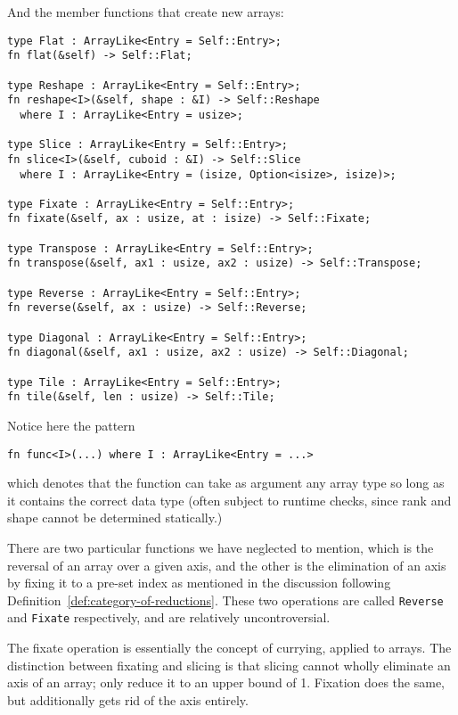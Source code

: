 \documentclass{DIKU-report-variant}
\begin{document}
And the member functions that create new arrays:

\begin{lstlisting}
type Flat : ArrayLike<Entry = Self::Entry>;
fn flat(&self) -> Self::Flat;

type Reshape : ArrayLike<Entry = Self::Entry>;
fn reshape<I>(&self, shape : &I) -> Self::Reshape
  where I : ArrayLike<Entry = usize>;

type Slice : ArrayLike<Entry = Self::Entry>;
fn slice<I>(&self, cuboid : &I) -> Self::Slice
  where I : ArrayLike<Entry = (isize, Option<isize>, isize)>;

type Fixate : ArrayLike<Entry = Self::Entry>;
fn fixate(&self, ax : usize, at : isize) -> Self::Fixate;

type Transpose : ArrayLike<Entry = Self::Entry>;
fn transpose(&self, ax1 : usize, ax2 : usize) -> Self::Transpose;

type Reverse : ArrayLike<Entry = Self::Entry>;
fn reverse(&self, ax : usize) -> Self::Reverse;

type Diagonal : ArrayLike<Entry = Self::Entry>;
fn diagonal(&self, ax1 : usize, ax2 : usize) -> Self::Diagonal;

type Tile : ArrayLike<Entry = Self::Entry>;
fn tile(&self, len : usize) -> Self::Tile;
\end{lstlisting}

Notice here the pattern
\begin{lstlisting}
fn func<I>(...) where I : ArrayLike<Entry = ...>
\end{lstlisting}
which denotes that the function can take as argument any array type so long
as it contains the correct data type (often subject to runtime checks, since rank
and shape cannot be determined statically.)

There are two particular functions we have neglected to mention, which is the reversal of an array
over a given axis, and the other is the elimination of an axis by fixing it to a pre-set index
as mentioned in the discussion following Definition~\ref{def:category-of-reductions}. These two
operations are called \texttt{Reverse} and \texttt{Fixate} respectively, and are relatively uncontroversial.

The fixate operation is essentially the concept of currying, applied to arrays.
The distinction between fixating and slicing is that slicing cannot wholly eliminate an axis of
an array; only reduce it to an upper bound of 1. Fixation does the same, but additionally gets rid
of the axis entirely.
\end{document}
